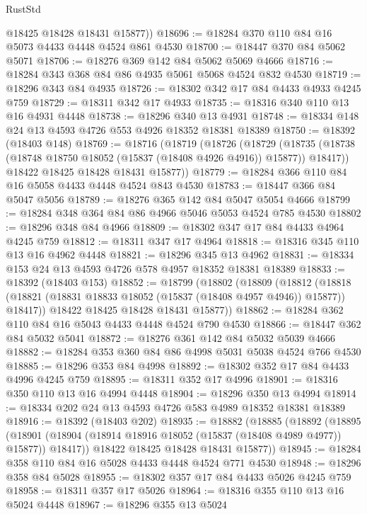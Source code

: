 \begin{lexlean}{RustStd}
\begin{coremodule}
{\begin{coremodule}
{{{{{{{{{{{{{{{{{{{{{{{{{{{{{{{{{{{{{{{{{{{{{{{{{{{{{{{{{{{{        @18425
        @18428
        @18431
        @15877))
@18696 := @18284 @370 @110 @84 @16 @5073 @4433 @4448 @4524 @861 @4530
@18700 := @18447 @370 @84 @5062 @5071
@18706 := @18276 @369 @142 @84 @5062 @5069 @4666
@18716 := @18284 @343 @368 @84 @86 @4935 @5061 @5068 @4524 @832 @4530
@18719 := @18296 @343 @84 @4935
@18726 := @18302 @342 @17 @84 @4433 @4933 @4245 @759
@18729 := @18311 @342 @17 @4933
@18735 := @18316 @340 @110 @13 @16 @4931 @4448
@18738 := @18296 @340 @13 @4931
@18748 := @18334 @148 @24 @13 @4593 @4726 @553 @4926 @18352 @18381 @18389
@18750 := @18392 (@18403 @148)
@18769 := @18716
    (@18719
      (@18726
        (@18729
          (@18735 (@18738 (@18748 @18750 @18052 (@15837 (@18408 @4926 @4916)) @15877)) @18417))
        @18422
        @18425
        @18428
        @18431
        @15877))
@18779 := @18284 @366 @110 @84 @16 @5058 @4433 @4448 @4524 @843 @4530
@18783 := @18447 @366 @84 @5047 @5056
@18789 := @18276 @365 @142 @84 @5047 @5054 @4666
@18799 := @18284 @348 @364 @84 @86 @4966 @5046 @5053 @4524 @785 @4530
@18802 := @18296 @348 @84 @4966
@18809 := @18302 @347 @17 @84 @4433 @4964 @4245 @759
@18812 := @18311 @347 @17 @4964
@18818 := @18316 @345 @110 @13 @16 @4962 @4448
@18821 := @18296 @345 @13 @4962
@18831 := @18334 @153 @24 @13 @4593 @4726 @578 @4957 @18352 @18381 @18389
@18833 := @18392 (@18403 @153)
@18852 := @18799
    (@18802
      (@18809
        (@18812
          (@18818 (@18821 (@18831 @18833 @18052 (@15837 (@18408 @4957 @4946)) @15877)) @18417))
        @18422
        @18425
        @18428
        @18431
        @15877))
@18862 := @18284 @362 @110 @84 @16 @5043 @4433 @4448 @4524 @790 @4530
@18866 := @18447 @362 @84 @5032 @5041
@18872 := @18276 @361 @142 @84 @5032 @5039 @4666
@18882 := @18284 @353 @360 @84 @86 @4998 @5031 @5038 @4524 @766 @4530
@18885 := @18296 @353 @84 @4998
@18892 := @18302 @352 @17 @84 @4433 @4996 @4245 @759
@18895 := @18311 @352 @17 @4996
@18901 := @18316 @350 @110 @13 @16 @4994 @4448
@18904 := @18296 @350 @13 @4994
@18914 := @18334 @202 @24 @13 @4593 @4726 @583 @4989 @18352 @18381 @18389
@18916 := @18392 (@18403 @202)
@18935 := @18882
    (@18885
      (@18892
        (@18895
          (@18901 (@18904 (@18914 @18916 @18052 (@15837 (@18408 @4989 @4977)) @15877)) @18417))
        @18422
        @18425
        @18428
        @18431
        @15877))
@18945 := @18284 @358 @110 @84 @16 @5028 @4433 @4448 @4524 @771 @4530
@18948 := @18296 @358 @84 @5028
@18955 := @18302 @357 @17 @84 @4433 @5026 @4245 @759
@18958 := @18311 @357 @17 @5026
@18964 := @18316 @355 @110 @13 @16 @5024 @4448
@18967 := @18296 @355 @13 @5024
}}}}}}}}}}}}}}}}}}}}}}}}}}}}}}}}}}}}}}}}}}}}}}}}}}}}}}}}}}}}
\end{coremodule}}
\end{coremodule}
\end{lexlean}
